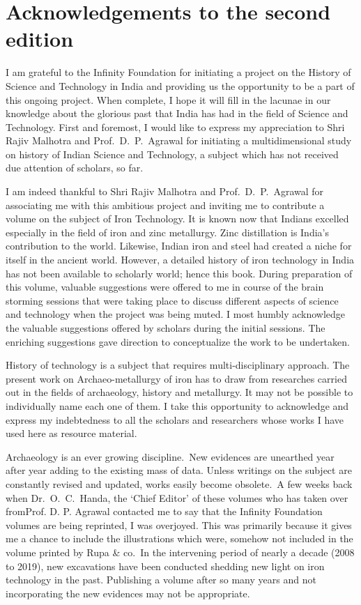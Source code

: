 \chapter*{Acknowledgements to the second edition}\label{acknowledgement}


\vspace{-.7cm}

I am grateful to the Infinity Foundation for initiating a project on the History of Science and Technology in India and providing us the opportunity to be a part of this ongoing project. When complete, I hope it will fill in the lacunae in our knowledge about the glorious past that India has had in the field of Science and Technology. First and foremost,  I would like to express my appreciation to Shri Rajiv Malhotra and Prof.~D.~P.~Agrawal for initiating a multidimensional study on history of Indian Science and Technology, a subject which has not received due attention of scholars, so far. 

I am indeed thankful to Shri Rajiv Malhotra and Prof.~D.~P.~Agrawal for associating me with this ambitious project and inviting me to contribute a volume on the subject of Iron Technology. It is known now that Indians excelled especially in the field of iron and zinc metallurgy. Zinc distillation is India’s contribution to the world. Likewise, Indian iron and steel had created a niche for itself in the ancient world.  However, a detailed history of iron technology in India has not been available to scholarly world; hence this book. During preparation of this volume, valuable suggestions were offered to me in course of the brain storming sessions that were taking place to discuss different aspects of science and technology when the project was being muted. I most humbly acknowledge the valuable suggestions offered by scholars during the initial sessions. The enriching suggestions gave direction to conceptualize the work to be undertaken. 

History of technology is a subject that requires multi-disciplinary approach. The present work on Archaeo-metallurgy of iron has to draw from researches carried out in the fields of archaeology, history and metallurgy. It may not be possible to individually name each one of them. I take this opportunity to acknowledge and express my indebtedness to all the scholars and researchers whose works I have used here as resource material. 

Archaeology is an ever growing discipline.~New evidences are unearthed year after year adding to the existing mass of data. Unless writings on the subject are constantly revised and updated, works easily become obsolete.~A few weeks back when Dr.~O.~C.~Handa, the  ‘Chief Editor’ of these volumes who has taken over from\break Prof. D. P. Agrawal contacted me to say that the Infinity Foundation volumes are being reprinted, I was overjoyed. This was primarily because it gives me a chance to include the illustrations which were, somehow not included in the volume printed by Rupa \& co.~In the intervening period of nearly a decade (2008 to 2019), new excavations have been conducted shedding new light on iron technology in the past. Publishing a volume after so many years and not incorporating the new evidences may not be appropriate. 


